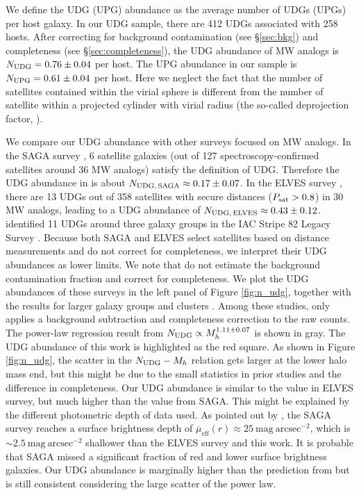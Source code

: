\documentclass[twocolumn,astrosymb,twocolappendix]{aastex631}
\newcommand{\sbunit}{\mathrm{mag\ arcsec}^{-2}}
\newcommand{\sbeffr}{\overline{\mu}_{\mathrm{eff}}(r)}
\begin{document}
\begin{CJK*}{UTF8}{gbsn}
We define the UDG (UPG) abundance as the average number of UDGs (UPGs) per host galaxy. In our UDG sample, there are 412 UDGs associated with 258 hosts. After correcting for background contamination (see \S \ref{sec:bkg}) and completeness (see \S \ref{sec:completeness}), the UDG abundance of MW analogs is $N_{\rm UDG} = 0.76\pm 0.04$ per host. The UPG abundance in our sample is $N_{\rm UPG} = 0.61\pm 0.04$ per host. Here we neglect the fact that the number of satellites contained within the virial sphere is different from the number of satellite within a projected cylinder with virial radius (the so-called deprojection factor, \citealt{vdBurg2017}).


We compare our UDG abundance with other surveys focused on MW analogs. In the SAGA survey \citep{SAGA-II}, 6 satellite galaxies (out of 127 spectroscopy-confirmed satellites around 36 MW analogs) satisfy the definition of UDG. Therefore the UDG abundance in \citet{SAGA-II} is about $N_{\rm UDG,\, SAGA} \approx 0.17\pm0.07$. In the ELVES survey \citep{CarlstenELVES2022}, there are 13 UDGs out of 358 satellites with secure distances ($P_{\rm sat} > 0.8$) in 30 MW analogs, leading to a UDG abundance of $N_{\rm UDG,\, ELVES} \approx 0.43\pm0.12$. \citet{Roman2017b} identified 11 UDGs around three galaxy groups in the IAC Stripe 82 Legacy Survey \citep{Fliri2016}. Because both SAGA and ELVES select satellites based on distance measurements and do not correct for completeness, we interpret their UDG abundances as lower limits. We note that \citet{Roman2017b} do not estimate the background contamination fraction and correct for completeness. We plot the UDG abundances of these surveys in the left panel of Figure \ref{fig:n_udg}, together with the results for larger galaxy groups and clusters \citep{Koda2015,Munoz2015,Roman2017a,Roman2017b,Janssens2017,vdBurg2017}. Among these studies, only \citet{vdBurg2017} applies a background subtraction and completeness correction to the raw counts.
The power-law regression result from \citet{vdBurg2017} $N_{\rm UDG} \propto M_h^{1.11\pm 0.07}$ is shown in gray. The UDG abundance of this work is highlighted as the red square. As shown in Figure \ref{fig:n_udg}, the scatter in the $N_{\rm UDG}-M_h$ relation gets larger at the lower halo mass end, but this might be due to the small statistics in prior studies and the difference in completeness. Our UDG abundance is similar to the value in ELVES survey, but much higher than the value from SAGA. This might be explained by the different photometric depth of data used. As pointed out by \citet{CarlstenELVES2022,Font2022}, the SAGA survey reaches a surface brightness depth of $\sbeffr\approx 25\ \sbunit$, which is $\sim 2.5\ \sbunit$ shallower than the ELVES survey and this work. It is probable that SAGA missed a significant fraction of red and lower surface brightness galaxies. Our UDG abundance is marginally higher than the prediction from \citet{vdBurg2017} but is still consistent considering the large scatter of the power law. 


\end{CJK*}
\end{document}
